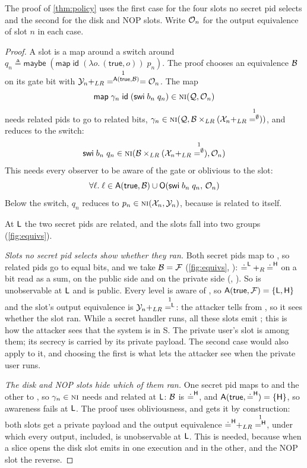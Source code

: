 The proof of \cref{thm:policy} uses the first case for the four slots no secret pid
selects and the second for the disk and NOP slots. Write $\mathcal{O}_n$ for the output
equivalence of slot $n$ in each case.

\begin{proof}
A slot is a map around a switch around
$q_n \triangleq \mathsf{maybe}\;(\mathsf{map}\;\mathsf{id}\;(\lambda o.\,(\mathsf{true},o))\;p_n)$.
The proof chooses an equivalence $\mathcal{B}$ on its gate
bit with $\Ey_n +_{LR} \one^{\Aw(\mathsf{true},\Eb)} = \Eout_n$. The map
\[
\mathsf{map}\;\gamma_n\;\mathsf{id}\;(\mathsf{swi}\;b_n\;q_n) \in \text{\normalfont\scshape ni}(\mathcal{Q},\mathcal{O}_n)
\]
needs related pids to go to related bits,
$\gamma_n \in \NI(\Eq,\Eb \times_{LR} (\Ex_n +_{LR} \one^\emptyset))$, and reduces to
the switch:
\[
\mathsf{swi}\;b_n\;q_n
  \in \NI(\Eb \times_{LR} (\Ex_n +_{LR} \one^\emptyset),\Eout_n)
\]
This needs every observer to be aware of the gate or oblivious to the slot:
\[
\forall \ell.\; \ell \in \mathsf{A}(\mathsf{true},\mathcal{B}) \cup
  \mathsf{O}(\mathsf{swi}\;b_n\;q_n,\,\mathcal{O}_n)
\]
Below the switch, $q_n$ reduces to
$p_n \in \text{\normalfont\scshape ni}(\mathcal{X}_n,\mathcal{Y}_n)$, because  is related to itself.

At $\mathsf{L}$ the two
secret pids are related, and the slots fall into two groups (\cref{fig:equivs}).

\emph{Slots no secret pid selects show whether they ran.} Both secret pids map to , so
related pids go to equal bits, and we take $\mathcal{B} = \mathcal{F}$ (\cref{fig:equivs},
): ${\doteq^{\mathsf{L}}} +_R {\doteq^{\mathsf{H}}}$ on a bit read as a sum,
 on the public side and  on the private side
(, ). So  is
unobservable at $\mathsf{L}$ and  is public. Every level is aware of
, so
$\mathsf{A}(\mathsf{true},\mathcal{F}) = \{\mathsf{L},\mathsf{H}\}$ and the slot's output equivalence is
$\Ey_n +_{LR} \one^\Lo$: the attacker tells  from
, so it sees whether the slot ran. While a secret handler runs, all these
slots emit ; this is how the attacker sees that the system is in S. The
private user's slot is among them; its secrecy is carried by its private payload.
The second case would also apply to it, and choosing the first is what lets the
attacker see when the private user runs.

\emph{The disk and NOP slots hide which of them ran.} One secret pid maps to  and the
other to , so $\gamma_n \in \text{\normalfont\scshape ni}$ needs  and  related at
$\mathsf{L}$: $\mathcal{B}$ is ${\doteq^{\mathsf{H}}}$, and
$\mathsf{A}(\mathsf{true},{\doteq^{\mathsf{H}}}) = \{\mathsf{H}\}$, so awareness fails at $\mathsf{L}$. The proof
uses obliviousness, and gets it by construction: both slots get a private payload
and the output equivalence $\priveq +_{LR} \one^\Hi$, under which every output,  included,
is unobservable at $\mathsf{L}$. This is needed, because when a slice opens the disk slot
emits  in one execution and  in the other, and the NOP slot the
reverse.
\end{proof}

